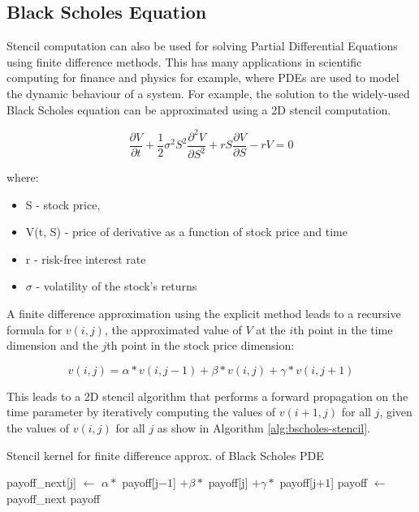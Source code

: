 \subsection{Black Scholes Equation}

Stencil computation can also be used for solving Partial Differential
Equations using finite difference methods. This has many applications
in scientific computing for finance and physics for example, where
PDEs are used to model the dynamic behaviour of a system. For example,
the solution to the widely-used Black Scholes equation can be
approximated using a 2D stencil computation.

\begin{equation}
  \frac{\partial V}{\partial t} + \frac{1}{2}\sigma^2S^2\frac{\partial^2 V}{\partial S^2} + rS\frac{\partial V}{\partial S} -rV = 0
\end{equation}

where:
\begin{itemize}
\item S - stock price,
\item V(t, S) - price of derivative as a function of stock price and time
\item r - risk-free interest rate
\item $\sigma$ - volatility of the stock's returns
\end{itemize}

A finite difference approximation using the explicit method leads to a
recursive formula \cite{blackscholes} for $v(i, j)$, the approximated
value of $V$ at the $i$th point in the time dimension and the $j$th
point in the stock price dimension:

\begin{equation}
  v(i, j) =
  \alpha * v(i, j - 1) +
  \beta  * v(i, j) +
  \gamma * v(i, j + 1)
\end{equation}

This leads to a 2D stencil algorithm that performs a forward
propagation on the time parameter by iteratively computing the values
of $v(i + 1, j)$ for all $j$, given the values of $v(i, j)$ for all
$j$ as show in Algorithm \ref{alg:bscholes-stencil}.

\begin{algorithm}
  \caption{Stencil kernel for finite difference approx. of Black Scholes PDE}
  \label{alg:bscholes-stencil}
  \begin{algorithmic}
    \State payoff\_next[j] $\gets$ $\alpha *$ payoff[j$ -1$] $+ \beta *$ payoff[j] $ + \gamma * $ payoff[j$ + 1$]
    \EndFor
    \State payoff $\gets$ payoff\_next
    \EndFor
    \State \Return payoff
    \EndFunction
  \end{algorithmic}
\end{algorithm}

